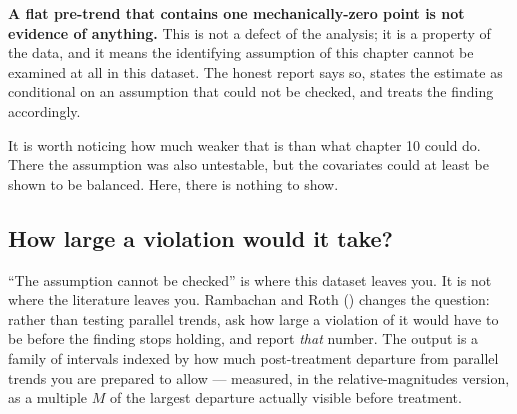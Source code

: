 \documentclass[
  letterpaper,
  10pt,
  twoside,
  openright,
  numbers=noenddot,
  chapterprefix=true]{scrbook}
\begin{document}
\textbf{A flat pre-trend that contains one mechanically-zero point is
not evidence of anything.} This is not a defect of the analysis; it is a
property of the data, and it means the identifying assumption of this
chapter cannot be examined at all in this dataset. The honest report
says so, states the estimate as conditional on an assumption that could
not be checked, and treats the finding accordingly.

It is worth noticing how much weaker that is than what chapter 10 could
do. There the assumption was also untestable, but the covariates could
at least be shown to be balanced. Here, there is nothing to show.

\subsection{How large a violation would it
take?}\label{how-large-a-violation-would-it-take}

``The assumption cannot be checked'' is where this dataset leaves you.
It is not where the literature leaves you. Rambachan and Roth
() changes the question: rather than
testing parallel trends, ask how large a violation of it would have to
be before the finding stops holding, and report \emph{that} number. The
output is a family of intervals indexed by how much post-treatment
departure from parallel trends you are prepared to allow --- measured,
in the relative-magnitudes version, as a multiple \(M\) of the largest
departure actually visible before treatment.
\end{document}
